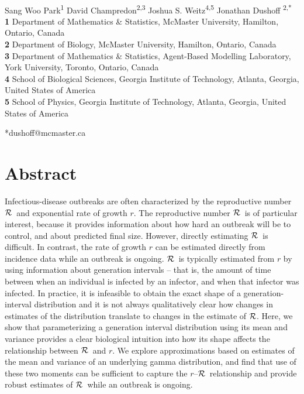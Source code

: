 \documentclass[12pt]{article}
\newcommand{\rR}{\mbox{$r$--$\cal R$}}
\newcommand{\RR}{\ensuremath{{\cal R}}}
\begin{document}
\begin{flushleft}
{
\Large
\textbf{}
}
\newline
\\
Sang Woo Park\textsuperscript{1}
David Champredon\textsuperscript{2,3}
Joshua S. Weitz\textsuperscript{4,5}
Jonathan Dushoff\textsuperscript{ 2,*}
\\

\bigskip
\textbf{1} Department of Mathematics \& Statistics, McMaster University, Hamilton, Ontario, Canada
\\
\textbf{2} Department of Biology, McMaster University, Hamilton, Ontario, Canada
\\
\textbf{3} Department of Mathematics \& Statistics, Agent-Based Modelling Laboratory, York University, Toronto, Ontario, Canada
\\
\textbf{4} School of Biological Sciences, Georgia Institute of Technology, Atlanta, Georgia, United States of America
\\
\textbf{5} School of Physics, Georgia Institute of Technology, Atlanta, Georgia, United States of America
\\
\bigskip

*dushoff@mcmaster.ca
\end{flushleft}

\section*{Abstract}

Infectious-disease outbreaks are often characterized by the reproductive number \RR\ and exponential rate of growth $r$.
The reproductive number \RR\ is of particular interest, because it provides information about how hard an outbreak will be to control, and about predicted final size.
However, directly estimating \RR\ is difficult.
In contrast, the rate of growth $r$ can be estimated directly from incidence data while an outbreak is ongoing.
\RR\ is typically estimated from $r$ by using information about generation intervals -- that is, the amount of time between when an individual is infected by an infector, and when that infector was infected.
In practice, it is infeasible to obtain the exact shape of a generation-interval distribution and it is not always qualitatively clear how changes in estimates of the distribution translate to changes in the estimate of \RR.
Here, we show that parameterizing a generation interval distribution using its mean and variance provides a clear biological intuition into how its shape affects the relationship between \RR\ and $r$.
We explore approximations based on estimates of the mean and variance of an underlying gamma distribution, and find that use of these two moments can be sufficient to capture the \rR\ relationship and provide robust estimates of \RR\ while an outbreak is ongoing.
\end{document}

